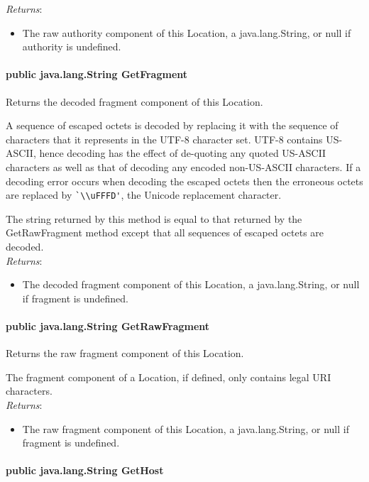 \documentclass[$Date: 2003/06/26 19:29:31 $]{glabarticle}
\begin{document}
\textit{Returns}:
\begin{itemize}
\item[] The raw authority component of this Location, a java.lang.String, or null if authority is undefined.
\end{itemize}

\paragraph{public java.lang.String GetFragment}

Returns the decoded fragment component of this Location.

A sequence of escaped octets is decoded by replacing it with the
sequence of characters that it represents in the UTF-8 character set.
UTF-8 contains US-ASCII, hence decoding has the effect of de-quoting
any quoted US-ASCII characters as well as that of decoding any encoded
non-US-ASCII characters.  If a decoding error occurs when decoding the
escaped octets then the erroneous octets are replaced by
\verb"`\\uFFFD'", the Unicode replacement character.

The string returned by this method is equal to that returned by the
GetRawFragment method except that all sequences of escaped octets are
decoded.\\
 
\textit{Returns}:
\begin{itemize}
\item[] The decoded fragment component of this Location, a java.lang.String, or null if fragment is undefined.
\end{itemize}

\paragraph{public java.lang.String GetRawFragment}

 Returns the raw fragment component of this Location.

 The fragment component of a Location, if defined, only contains legal
 URI characters.\\
 
 \textit{Returns}:
 \begin{itemize}
 \item[] The raw fragment component of this Location, a java.lang.String, or null if fragment is undefined.
 \end{itemize}

\paragraph{public java.lang.String GetHost}
\end{document}
